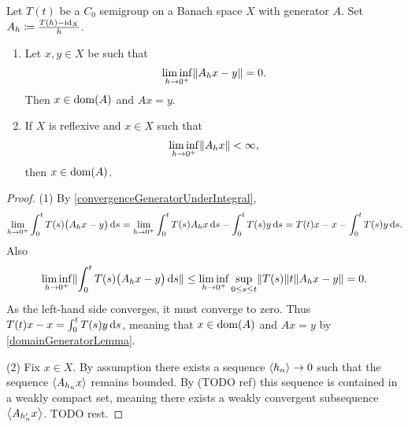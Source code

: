 \begin{proposition} \label{convergenceGeneratorLiminf}
Let $T(t)$ be a $C_0$ semigroup on a Banach space $X$ with generator $A$. Set $A_h \coloneqq \frac{T(h) - \operatorname{id}_X}{h}$.
\begin{enumerate}
\item Let $x,y\in X$ be such that
\[ \liminf_{h \to 0^+}\lVert A_hx - y\rVert = 0. \]
Then $x\in \operatorname{dom}(A)$ and $Ax = y$.
\item If $X$ is reflexive and $x\in X$ such that
\[ \liminf_{h\to 0^+}\lVert A_hx\rVert <\infty, \]
then $x\in \operatorname{dom}(A)$.
\end{enumerate}
\end{proposition}
\begin{proof}
(1) By \ref{convergenceGeneratorUnderIntegral},
\[ \lim_{h\to 0^+}\int_0^t T(s)\big(A_hx - y\big)\operatorname{d \!}{s} = \lim_{h\to 0^+}\int_0^t T(s)A_hx\operatorname{d \!}{s} - \int_0^t T(s)y\operatorname{d \!}{s} = T(t)x - x - \int_0^t T(s)y\operatorname{d \!}{s}. \]
Also
\[ \liminf_{h\to 0^+}\lVert\int_0^t T(s)\big(A_hx - y\big)\operatorname{d \!}{s}\rVert \leq \liminf_{h\to 0^+}\sup_{0\leq s\leq t}\lVert T(s)\rVert t\lVert A_hx - y\rVert = 0. \]
As the left-hand side converges, it must converge to zero. Thus $T(t)x - x = \int_0^t T(s)y\operatorname{d \!}{s}$, meaning that $x\in\operatorname{dom}(A)$ and $Ax = y$ by \ref{domainGeneratorLemma}.

(2) Fix $x\in X$. By assumption there exists a sequence $\left\langle h_n \right\rangle\to 0$ such that the sequence $\left\langle A_{h_n}x \right\rangle$ remains bounded. By (TODO ref) this sequence is contained in a weakly compact set, meaning there exists a weakly convergent subsequence $\left\langle A_{h'_n}x \right\rangle$. TODO rest.
\end{proof}

